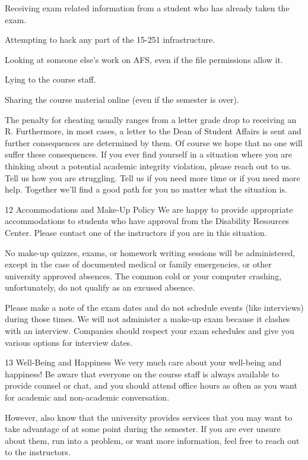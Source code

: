 Receiving exam related information from a student who has already taken the exam.

Attempting to hack any part of the 15-251 infrastructure.

Looking at someone else’s work on AFS, even if the file permissions allow it.

Lying to the course staff.

Sharing the course material online (even if the semester is over).

The penalty for cheating usually ranges from a letter grade drop to receiving an R. Furthermore, in most cases, a letter to the Dean of Student Affairs is sent and further consequences are determined by them. Of course we hope that no one will suffer these consequences. If you ever find yourself in a situation where you are thinking about a potential academic integrity violation, please reach out to us. Tell us how you are struggling. Tell us if you need more time or if you need more help. Together we’ll find a good path for you no matter what the situation is.

 
12  Accommodations and Make-Up Policy
We are happy to provide appropriate accommodations to students who have approval from the Disability Resources Center. Please contact one of the instructors if you are in this situation.

No make-up quizzes, exams, or homework writing sessions will be administered, except in the case of documented medical or family emergencies, or other university approved absences. The common cold or your computer crashing, unfortunately, do not qualify as an excused absence.

Please make a note of the exam dates and do not schedule events (like interviews) during those times. We will not administer a make-up exam because it clashes with an interview. Companies should respect your exam schedules and give you various options for interview dates.

 
13  Well-Being and Happiness
We very much care about your well-being and happiness! Be aware that everyone on the course staff is always available to provide counsel or chat, and you should attend office hours as often as you want for academic and non-academic conversation.

However, also know that the university provides services that you may want to take advantage of at some point during the semester. If you are ever unsure about them, run into a problem, or want more information, feel free to reach out to the instructors.

